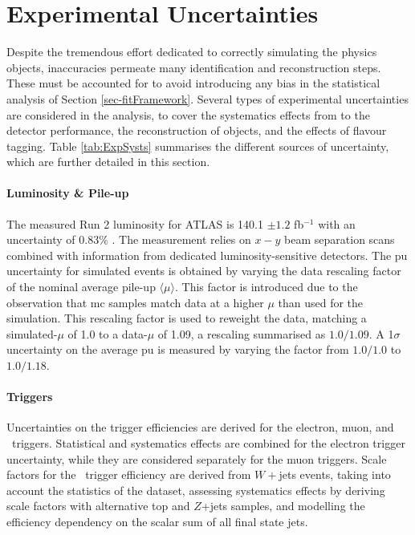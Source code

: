 \section{Experimental Uncertainties}\label{sec-unc}
Despite the tremendous effort dedicated to correctly simulating the physics objects, inaccuracies permeate many identification and reconstruction steps. These must be accounted for to avoid introducing any bias in the statistical analysis of Section \ref{sec-fitFramework}. Several types of experimental uncertainties are considered in the analysis, to cover the systematics effects from to the detector performance, the reconstruction of objects, and the effects of flavour tagging. Table \ref{tab:ExpSysts} summarises the different sources of uncertainty, which are further detailed in this section.

\paragraph{Luminosity \& Pile-up} The measured Run 2 luminosity for ATLAS is 140.1 $\pm 1.2$ fb$^{-1}$ with an uncertainty of 0.83\% \cite{ATLAS:2022hro}. The measurement relies on $x-y$ beam separation scans combined with information from dedicated luminosity-sensitive detectors. The \gls{pu} uncertainty for simulated events is obtained by varying the data rescaling factor of the nominal average pile-up $\langle \mu \rangle$. This factor is introduced due to the observation that \gls{mc} samples match data at a higher $\mu$ than used for the simulation. This rescaling factor is used to reweight the data, matching a simulated-$\mu$ of 1.0 to a data-$\mu$ of 1.09, a rescaling summarised as $1.0/1.09$. A 1$\sigma$ uncertainty on the average \gls{pu} is measured by varying the factor from $1.0/1.0$ to $1.0/1.18$. %

\paragraph{Triggers} Uncertainties on the trigger efficiencies are derived for the electron, muon, and \etm\ triggers. Statistical and systematics effects are combined for the electron trigger uncertainty, while they are considered separately for the muon triggers. Scale factors for the \etm\ trigger efficiency are derived from $W+$jets events, taking into account the statistics of the dataset, assessing systematics effects by deriving scale factors with alternative top and $Z$+jets samples, and modelling the efficiency dependency on the scalar sum of all final state jets.

